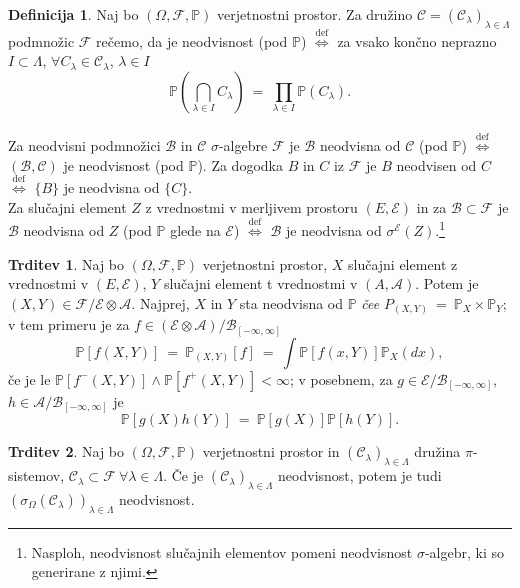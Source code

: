 \documentclass[11pt]{article}
\renewcommand{\P}{\mathbb{P}}
\newcommand{\A}{\mathcal{A}}
\newcommand{\BB}{\mathcal{B}}
\newcommand{\CC}{\mathcal{C}}
\newcommand{\F}{\mathcal{F}}
\newcommand{\B}{\mathscr{B}}
\newcommand{\C}{\mathcal{C}}
\newcommand{\EE}{\mathcal{E}}
\newcommand{\diff}{\overset{\text{def}}{\iff}}
\newcommand{\set}[1]{\{#1\}}
\newcommand{\oklepaj}[1]{\left(#1\right)}
\newcommand{\1}{\mathbbm{1}}
\newcommand{\rr}{[-\infty,\infty]}
\theoremstyle{definition}
\newtheorem{definicija}{Definicija}[section]
\theoremstyle{definition}
\newtheorem{trditev}{Trditev}[section]
\theoremstyle{definition}
\theoremstyle{definition}
\begin{document}
\begin{definicija}

Naj bo $(\Omega, \F, \P)$ verjetnostni prostor. Za družino $\C=(\C_\lambda)_{\lambda\in\Lambda}$ podmnožic $\F$ rečemo, da je neodvisnost (pod $\P$) $\diff$ za vsako končno neprazno $I \subset \Lambda$, $\forall C_\lambda \in \C_\lambda$, $\lambda \in I$
$$\P\oklepaj{\bigcap_{\lambda \in I} C_\lambda} ~=~ \prod_{\lambda \in I} \P(C_\lambda).$$\\

Za neodvisni podmnožici $\BB$ in $\CC$ $\sigma$-algebre $\F$ je $\BB$ neodvisna od $\CC$ (pod $\P$) $\diff$ $(\BB,\CC)$ je neodvisnost (pod $\P$). Za dogodka $B$ in $C$ iz $\F$ je $B$ neodvisen od $C$ $\diff$ $\set{B}$ je neodvisna od $\set{C}$. \\

Za slučajni element $Z$ z vrednostmi v merljivem prostoru $(E,\EE)$ in za $\BB \subset \F$ je $\BB$ neodvisna od $Z$ (pod $\P$ glede na $\EE$) $\diff$ $\BB$ je neodvisna od $\sigma^\EE(Z)$.\footnote{Nasploh, neodvisnost slučajnih elementov pomeni neodvisnost $\sigma$-algebr, ki so generirane z njimi.}

\end{definicija}
\vspace{0.5cm}

\begin{trditev}

Naj bo $(\Omega, \F, \P)$ verjetnostni prostor, $X$ slučajni element z vrednostmi v $(E, \EE)$, $Y$ slučajni element t vrednostmi v $(A, \A)$. Potem je $(X,Y) \in \F/\EE\otimes\A$. Najprej, $X$ in $Y$ sta neodvisna od $\P$ \textit{čee} \hbox{$P_{(X,Y)} ~=~ \P_X \times \P_Y$};
v tem primeru je za $f \in (\EE \otimes \A)/\B_{\rr}$
$$\P[f(X,Y)] ~=~ \P_{(X,Y)}[f] ~=~ \int \P[f(x,Y)]\P_X(dx),$$
če je le $\P[f^-(X,Y)] \wedge \P[f^+(X,Y)] < \infty$; v posebnem, za $g \in \EE/\B_{\rr}$, $h \in \A/\B_{\rr}$ je
$$\P[g(X)h(Y)] ~=~ \P[g(X)]\P[h(Y)].$$

\end{trditev}
\vspace{0.5cm}

\begin{trditev}

Naj bo $(\Omega, \F, \P)$ verjetnostni prostor in $(\C_\lambda)_{\lambda \in \Lambda}$ družina $\pi$-sistemov, $\C_\lambda \subset \F ~\forall \lambda \in \Lambda$. Če je $(\C_\lambda)_{\lambda \in \Lambda}$ neodvisnost, potem je tudi $(\sigma_\Omega(\C_\lambda))_{\lambda\in\Lambda}$ neodvisnost.

\end{trditev}
\vspace{0.5cm}
\end{document}
